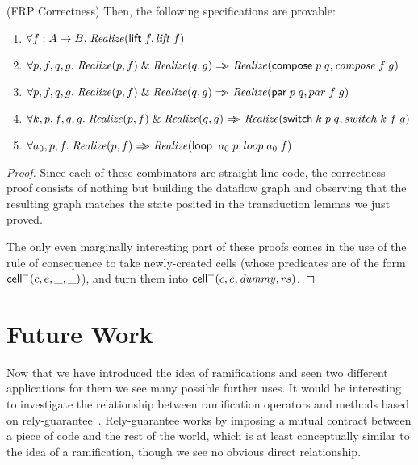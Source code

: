 \begin{prop*}{(FRP Correctness)}
Then, the following specifications are provable: 
\begin{enumerate}
\item $\forall f:A\to B.\; \mathit{Realize}(\mathsf{lift}\; f, \mathit{lift}\;f)$
\item $\forall p, f, q, g.\;\mathit{Realize}(p, f) \;\&\; \mathit{Realize}(q, g) \Rightarrow\!\!\!> \mathit{Realize}(\mathsf{compose}\; p\;q, \mathit{compose}\;f\;g)$
\item $\forall p, f, q, g.\;\mathit{Realize}(p, f) \;\&\; \mathit{Realize}(q, g)
                       \Rightarrow\!\!\!> \mathit{Realize}(\mathsf{par}\; p\;q, par\;f\;g)$
\item $\forall k, p, f, q, g.\;\mathit{Realize}(p, f) \;\&\; \mathit{Realize}(q, g)
                          \Rightarrow\!\!\!> \mathit{Realize}(\mathsf{switch}\; k\;p\;q, switch\;k\;f\;g)$
\item $\forall a_0, p, f.\; \mathit{Realize}(p, f) \Rightarrow\!\!\!> \mathit{Realize}(\mathsf{loop}\;\;a_0\;p, loop\;a_0\;f)$
\end{enumerate}
\end{prop*}

\begin{proof}
  Since each of these combinators are straight line code, the
  correctness proof consists of nothing but building the dataflow
  graph and observing that the resulting graph matches the state
  posited in the transduction lemmas we just proved.

  The only even marginally interesting part of these proofs comes in
  the use of the rule of consequence to take newly-created cells (whose
  predicates are of the form $\mathsf{cell}^{-}({c}, {e}, {\_}, {\_})$), and turn them into
  $\mathsf{cell}^{+}({c}, {e}, {\mathit{dummy}}, {rs})$.
\end{proof}

\section{Future Work}

Now that we have introduced the idea of ramifications and seen two
different applications for them we see many possible further uses.  It
would be interesting to investigate the relationship between
ramification operators and methods based on
rely-guarantee~\cite{rely-guarantee-jones}. Rely-guarantee works by
imposing a mutual contract between a piece of code and the rest of the
world, which is at least conceptually similar to the idea of a
ramification, though we see no obvious direct relationship.

